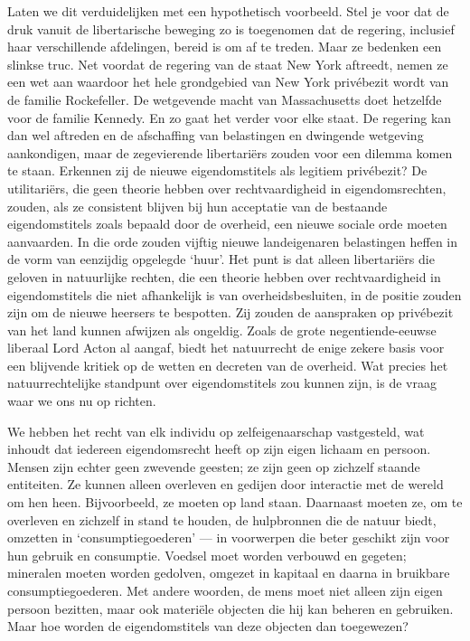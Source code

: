 \documentclass[
  a5paper,
  smalldemyvopaper,10pt,twoside,onecolumn,openright,extrafontsizes,hidelinks]{memoir}
\begin{document}
Laten we dit verduidelijken met een hypothetisch voorbeeld. Stel je voor
dat de druk vanuit de libertarische beweging zo is toegenomen dat de
regering, inclusief haar verschillende afdelingen, bereid is om af te
treden. Maar ze bedenken een slinkse truc. Net voordat de regering van
de staat New York aftreedt, nemen ze een wet aan waardoor het hele
grondgebied van New York privébezit wordt van de familie Rockefeller. De
wetgevende macht van Massachusetts doet hetzelfde voor de familie
Kennedy. En zo gaat het verder voor elke staat. De regering kan dan wel
aftreden en de afschaffing van belastingen en dwingende wetgeving
aankondigen, maar de zegevierende libertariërs zouden voor een dilemma
komen te staan. Erkennen zij de nieuwe eigendomstitels als legitiem
privébezit? De utilitariërs, die geen theorie hebben over
rechtvaardigheid in eigendomsrechten, zouden, als ze consistent blijven
bij hun acceptatie van de bestaande eigendomstitels zoals bepaald door
de overheid, een nieuwe sociale orde moeten aanvaarden. In die orde
zouden vijftig nieuwe landeigenaren belastingen heffen in de vorm van
eenzijdig opgelegde `huur'. Het punt is dat alleen libertariërs die
geloven in natuurlijke rechten, die een theorie hebben over
rechtvaardigheid in eigendomstitels die niet afhankelijk is van
overheidsbesluiten, in de positie zouden zijn om de nieuwe heersers te
bespotten. Zij zouden de aanspraken op privébezit van het land kunnen
afwijzen als ongeldig. Zoals de grote negentiende-eeuwse liberaal Lord
Acton al aangaf, biedt het natuurrecht de enige zekere basis voor een
blijvende kritiek op de wetten en decreten van de overheid. Wat precies
het natuurrechtelijke standpunt over eigendomstitels zou kunnen zijn, is
de vraag waar we ons nu op richten.

We hebben het recht van elk individu op zelfeigenaarschap vastgesteld,
wat inhoudt dat iedereen eigendomsrecht heeft op zijn eigen lichaam en
persoon. Mensen zijn echter geen zwevende geesten; ze zijn geen op
zichzelf staande entiteiten. Ze kunnen alleen overleven en gedijen door
interactie met de wereld om hen heen. Bijvoorbeeld, ze moeten op land
staan. Daarnaast moeten ze, om te overleven en zichzelf in stand te
houden, de hulpbronnen die de natuur biedt, omzetten in
`consumptiegoederen' --- in voorwerpen die beter geschikt zijn voor hun
gebruik en consumptie. Voedsel moet worden verbouwd en gegeten;
mineralen moeten worden gedolven, omgezet in kapitaal en daarna in
bruikbare consumptiegoederen. Met andere woorden, de mens moet niet
alleen zijn eigen persoon bezitten, maar ook materiële objecten die hij
kan beheren en gebruiken. Maar hoe worden de eigendomstitels van deze
objecten dan toegewezen?
\end{document}
